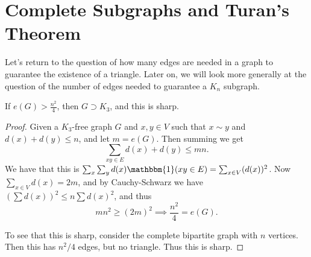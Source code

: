 \documentclass[a4paper]{scrreprt}
\begin{document}
\section{Complete Subgraphs and Turan's Theorem}

Let's return to the question of how many edges are needed in a graph to guarantee the existence of a triangle. Later on, we will look more generally at the question of the number of edges needed to guarantee a $K_n$ subgraph.

\begin{theorem}
	If $e(G) > \frac{n^2}{4}$, then $G \supset K_3$, and this is sharp.
\end{theorem}
\begin{proof}
	Given a $K_3$-free graph $G$ and $x, y \in V$ such that $x \sim y$ and $d(x) + d(y) \leq n$, and let $m = e(G)$.
	Then summing we get
	$$
	\sum_{xy \in E} d(x) + d(y) \leq mn.
	$$
	We have that this is $\sum_x \sum_y d(x) \mathbbm{1}(xy \in E) = \sum_{x \in V} (d(x))^2$.
	Now $\sum_{x \in V} d(x) = 2m$, and by Cauchy-Schwarz we have $(\sum d(x))^2 \leq n\sum d(x)^2$, and thus
	$$
	m n^2 \geq (2m)^2 \implies \frac{n^2}{4} = e(G).
	$$

	To see that this is sharp, consider the complete bipartite graph with $n$ vertices. Then this has $n^2/4$ edges, but no triangle. Thus this is sharp.
\end{proof}
\end{document}

